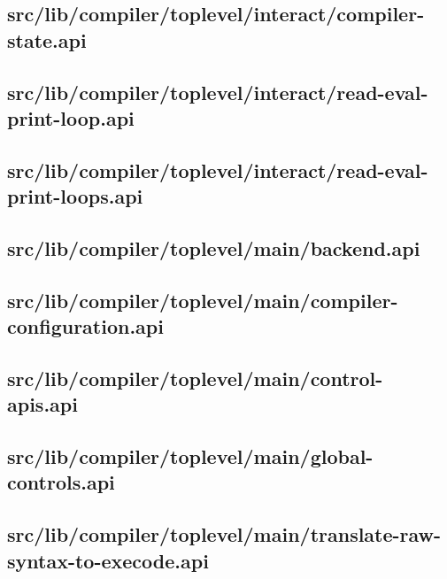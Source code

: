 \subsection{src/lib/compiler/toplevel/interact/compiler-state.api}


\subsection{src/lib/compiler/toplevel/interact/read-eval-print-loop.api}


\subsection{src/lib/compiler/toplevel/interact/read-eval-print-loops.api}


\subsection{src/lib/compiler/toplevel/main/backend.api}


\subsection{src/lib/compiler/toplevel/main/compiler-configuration.api}


\subsection{src/lib/compiler/toplevel/main/control-apis.api}


\subsection{src/lib/compiler/toplevel/main/global-controls.api}


\subsection{src/lib/compiler/toplevel/main/translate-raw-syntax-to-execode.api}


